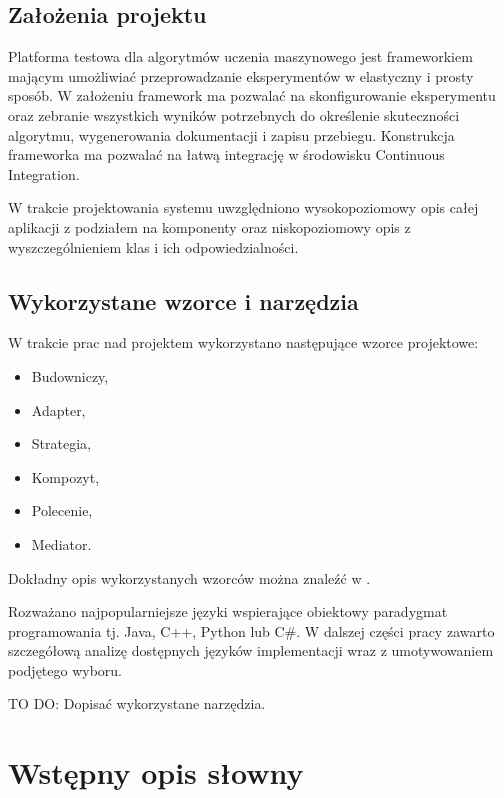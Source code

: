 \documentclass[12pt]{article}
\begin{document}
\subsection{Założenia projektu}

Platforma testowa dla algorytmów uczenia maszynowego jest frameworkiem mającym umożliwiać przeprowadzanie eksperymentów w elastyczny i prosty sposób. W założeniu framework ma pozwalać na skonfigurowanie eksperymentu oraz zebranie wszystkich wyników potrzebnych do określenie skuteczności algorytmu, wygenerowania dokumentacji i zapisu przebiegu. Konstrukcja frameworka ma pozwalać na łatwą integrację w środowisku Continuous Integration.

W trakcie projektowania systemu uwzględniono wysokopoziomowy opis całej aplikacji z podziałem na komponenty oraz niskopoziomowy opis z wyszczególnieniem klas i ich odpowiedzialności.

\subsection{Wykorzystane wzorce i narzędzia}

W trakcie prac nad projektem wykorzystano następujące wzorce projektowe:

\begin{itemize}
	\item Budowniczy,
	\item Adapter,
	\item Strategia,
	\item Kompozyt,
	\item Polecenie,
	\item Mediator.
\end{itemize}

Dokładny opis wykorzystanych wzorców można znaleźć w \cite{gang-of-four}.

Rozważano najpopularniejsze języki wspierające obiektowy paradygmat programowania tj. Java, C++, Python lub C\#. W dalszej części pracy zawarto szczegółową analizę dostępnych języków implementacji wraz z umotywowaniem podjętego wyboru. 

TO DO: Dopisać wykorzystane narzędzia.


\section{Wstępny opis słowny}
\end{document}

